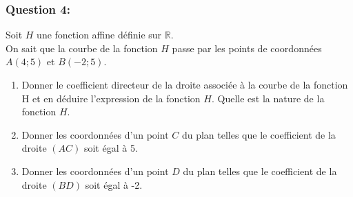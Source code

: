\documentclass[t,12pt]{beamer}
\newcommand{\R}{\mathbb{R}}
\begin{document}
\begin{frame}
	\frametitle{Question 4: }
	
	Soit $H$ une fonction affine définie sur $\R$.\hfill\\[0.2cm]
	
	On sait que la courbe de la fonction $H$ passe par les points de coordonnées $A(4;5)$ et $B(-2;5)$. 
	\begin{enumerate}
		\item Donner le coefficient directeur de la droite associée à la courbe de la fonction H et en déduire l'expression de la fonction $H$. Quelle est la nature de la fonction $H$.  
		\item Donner les coordonnées d'un point $C$ du plan telles que le coefficient de la droite $\left(AC\right)$ soit égal à 5. 
		\item Donner les coordonnées d'un point $D$ du plan telles que le coefficient de la droite $\left(BD\right)$ soit égal à -2. 
		
	\end{enumerate}
	
	
\end{frame}
\end{document}
